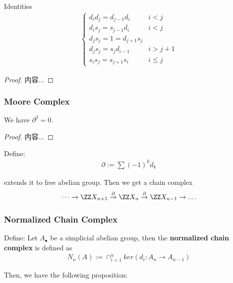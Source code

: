 \documentclass[Total.tex]{subfiles}
\begin{document}
			\begin{proposition}
				Identities
				\begin{gather*}
					\begin{cases}
						d_id_j=d_{j-1}d_i&i<j\\
						d_is_j=s_{j-1}d_i&i<j\\
						d_js_j=1=d_{j+1}s_j\\
						d_js_j=s_jd_{i-1}&i>j+1\\
						s_is_j=s_{j+1}s_i&i\leq j
					\end{cases}
				\end{gather*}
			\end{proposition}
			\begin{proof}
				内容...
			\end{proof}
			
			\subsubsection{Moore Complex}
				\begin{lemma}
					We have $\partial^2=0$. 
				\end{lemma}
				\begin{proof}
					内容...
				\end{proof}
				
				\begin{Def}
					Define:
					\begin{gather*}
						\partial:=\sum (-1)^k d_k
					\end{gather*}
					
					extends it to free abelian group. Then we get a chain complex
					\begin{gather*}
						\dots\rightarrow \ZZ X_{n+1}\stackrel{\partial}{\rightarrow}\ZZ X_n\stackrel{\partial}{\rightarrow} \ZZ X_{n-1}\rightarrow\dots
					\end{gather*}
				\end{Def}
				
				\subsubsection{Normalized Chain Complex}
				\begin{Def}
					Define: Let $A_\bullet$ be a simplicial abelian group, then the \textbf{normalized chain complex} is defined as
					\begin{gather*}
						N_n(A):=\cap_{i=1}^n ker(d_i:A_n\rightarrow A_{n-1})
					\end{gather*}
				\end{Def}
					Then, we have the following proposition:
\end{document}
